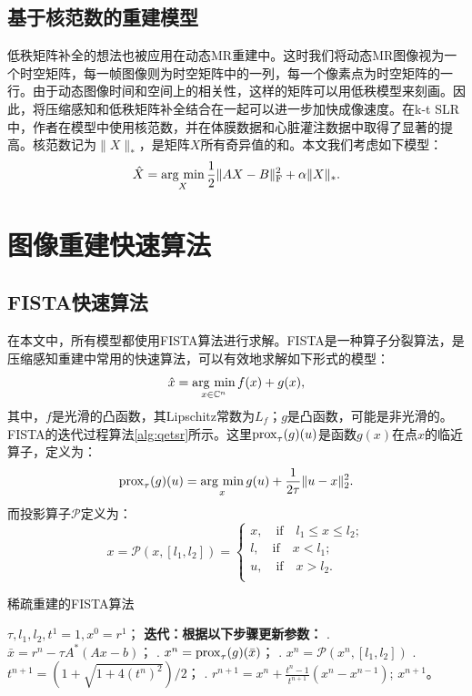 \subsection{基于核范数的重建模型}
低秩矩阵补全的想法也被应用在动态MR重建中。这时我们将动态MR图像视为一个时空矩阵，每一帧图像则为时空矩阵中的一列，每一个像素点为时空矩阵的一行。由于动态图像时间和空间上的相关性，这样的矩阵可以用低秩模型来刻画。因此，将压缩感知和低秩矩阵补全结合在一起可以进一步加快成像速度。在k-t SLR中，作者在模型中使用核范数，并在体膜数据和心脏灌注数据中取得了显著的提高。核范数记为$\|X\|_*$，是矩阵$X$所有奇异值的和。本文我们考虑如下模型：
\begin{equation}
\hat{X} = \argmin_X{\frac{1}{2}\|AX-B\|^2_\mathrm{F} + \alpha\|X\|_*}.
\end{equation}

\section{图像重建快速算法}
\subsection{FISTA快速算法}
在本文中，所有模型都使用FISTA\cite{fista}算法进行求解。FISTA是一种算子分裂算法，是压缩感知重建中常用的快速算法，可以有效地求解如下形式的模型：
\begin{equation}
\hat{x} = \argmin_{x \in \mathbb{\mathbb{C}}^n} f(x) + g(x),
\end{equation}
其中，$f$是光滑的凸函数，其Lipschitz常数为$L_f$；$g$是凸函数，可能是非光滑的。FISTA的迭代过程算法\ref{alg:qetsr}所示。这里$\mathrm{prox}_\tau(g)(u)$是函数$g(x)$在点$x$的临近算子，定义为：
\begin{equation}
\prox_\tau(g)(u)=\argmin_x{g(u)+\frac{1}{2\tau}}\|u-x\|_2^2.
\label{equ:prox}
\end{equation}
而投影算子$\mathscr{P}$定义为：
\begin{equation}
x=\mathscr{P}(x,[l_1,l_2]) =
\left\{
\begin{array}{ll}
x, \quad \mbox{if} \quad l_1\leq x\leq l_2; \\
l, \quad \mbox{if} \quad x<l_1;\\
u, \quad \mbox{if} \quad x>l_2.\\
\end{array}\right.
\end{equation}

\begin{algorithm}
	\caption{稀疏重建的FISTA算法}
	\label{alg:qetsr}
	\begin{algorithmic}
		\REQUIRE $\tau, l_1, l_2, t^1=1, x^0=r^1$；
		\INDSTATE[-1.25] \textbf{迭代：根据以下步骤更新参数：}	
		. $\bar{x}=r^n-\tau A^*(Ax-b)$；
		. $x^n=\mathrm{prox}_{\tau}(g)(\bar{x})$；
		. $x^n=\mathscr{P}(x^n,[l_1,l_2])$
		. $t^{n+1}=(1+\sqrt{1+4(t^n)^2})/2$；
		. $r^{n+1}=x^n+\frac{t^n-1}{t^{n+1}}(x^n-x^{n-1})$;
		\ENSURE $x^{n+1}$。
	\end{algorithmic}
\end{algorithm}

